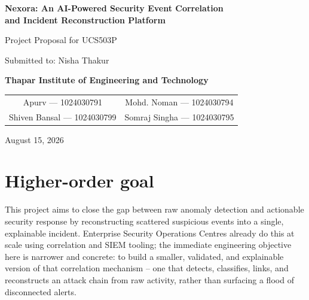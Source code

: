 \documentclass[12pt]{article}
\begin{document}
\thispagestyle{empty}

\begin{center}
\vspace*{1.65in}

{\LARGE\bfseries
Nexora: An AI-Powered Security Event Correlation\\
and Incident Reconstruction Platform\par}

\vspace{0.35in}

{\large Project Proposal for UCS503P\par}

\vspace{0.08in}

{\large Submitted to: Nisha Thakur\par}

{\large\bfseries Thapar Institute of Engineering and Technology\par}

\vspace{0.70in}

\begin{tabular}{cc}
Apurv --- 1024030791 & Mohd. Noman --- 1024030794 \\
Shiven Bansal --- 1024030799 & Somraj Singha --- 1024030795
\end{tabular}

\vspace{0.45in}

{\large August 15, 2026\par}
\end{center}

\clearpage
\setcounter{page}{1}

\section{Higher-order goal}

This project aims to close the gap between raw anomaly detection and actionable security response by reconstructing scattered suspicious events into a single, explainable incident. Enterprise Security Operations Centres already do this at scale using correlation and SIEM tooling; the immediate engineering objective here is narrower and concrete: to build a smaller, validated, and explainable version of that correlation mechanism -- one that detects, classifies, links, and reconstructs an attack chain from raw activity, rather than surfacing a flood of disconnected alerts.
\end{document}
